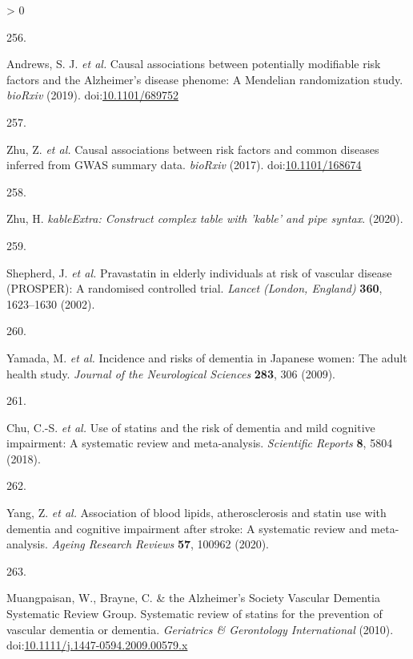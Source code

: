 \documentclass[a4paper, twoside]{templates/ociamthesis}
\newlength{\cslhangindent}
\newlength{\csllabelwidth}
\newenvironment{CSLReferences}[3] %
 {%
  \setlength{\parindent}{0pt}
  \ifodd #1 \everypar{\setlength{\hangindent}{\cslhangindent}}\ignorespaces\fi
  \ifnum #2 > 0
  \setlength{\parskip}{#2\baselineskip}
  \fi
 }%
 {}
\newcommand{\CSLLeftMargin}[1]{\parbox[t]{\maxof{\widthof{#1}}{\csllabelwidth}}{#1}}
\newcommand{\CSLRightInline}[1]{\parbox[t]{\linewidth - \csllabelwidth}{#1}}
\begin{document}
\begin{CSLReferences}{0}{0}
\leavevmode\hypertarget{ref-andrews2019}{}%
\CSLLeftMargin{256. }
\CSLRightInline{Andrews, S. J. \emph{et al.} Causal associations between potentially modifiable risk factors and the {Alzheimer}'s disease phenome: A {Mendelian} randomization study. \emph{bioRxiv} (2019). doi:\href{https://doi.org/10.1101/689752}{10.1101/689752}}

\leavevmode\hypertarget{ref-zhu2017}{}%
\CSLLeftMargin{257. }
\CSLRightInline{Zhu, Z. \emph{et al.} Causal associations between risk factors and common diseases inferred from {GWAS} summary data. \emph{bioRxiv} (2017). doi:\href{https://doi.org/10.1101/168674}{10.1101/168674}}

\leavevmode\hypertarget{ref-zhu2020}{}%
\CSLLeftMargin{258. }
\CSLRightInline{Zhu, H. \emph{{kableExtra}: Construct complex table with 'kable' and pipe syntax}. (2020).}

\leavevmode\hypertarget{ref-shepherd2002}{}%
\CSLLeftMargin{259. }
\CSLRightInline{Shepherd, J. \emph{et al.} Pravastatin in elderly individuals at risk of vascular disease ({PROSPER}): A randomised controlled trial. \emph{Lancet (London, England)} \textbf{360}, 1623--1630 (2002).}

\leavevmode\hypertarget{ref-yamada2009conf}{}%
\CSLLeftMargin{260. }
\CSLRightInline{Yamada, M. \emph{et al.} Incidence and risks of dementia in {Japanese} women: The adult health study. \emph{Journal of the Neurological Sciences} \textbf{283}, 306 (2009).}

\leavevmode\hypertarget{ref-chu2018}{}%
\CSLLeftMargin{261. }
\CSLRightInline{Chu, C.-S. \emph{et al.} Use of statins and the risk of dementia and mild cognitive impairment: A systematic review and meta-analysis. \emph{Scientific Reports} \textbf{8}, 5804 (2018).}

\leavevmode\hypertarget{ref-yang2020}{}%
\CSLLeftMargin{262. }
\CSLRightInline{Yang, Z. \emph{et al.} Association of blood lipids, atherosclerosis and statin use with dementia and cognitive impairment after stroke: A systematic review and meta-analysis. \emph{Ageing Research Reviews} \textbf{57}, 100962 (2020).}

\leavevmode\hypertarget{ref-muangpaisan2010}{}%
\CSLLeftMargin{263. }
\CSLRightInline{Muangpaisan, W., Brayne, C. \& the Alzheimer's Society Vascular Dementia Systematic Review Group. Systematic review of statins for the prevention of vascular dementia or dementia. \emph{Geriatrics \& Gerontology International} (2010). doi:\href{https://doi.org/10.1111/j.1447-0594.2009.00579.x}{10.1111/j.1447-0594.2009.00579.x}}


\end{CSLReferences}
\end{document}
